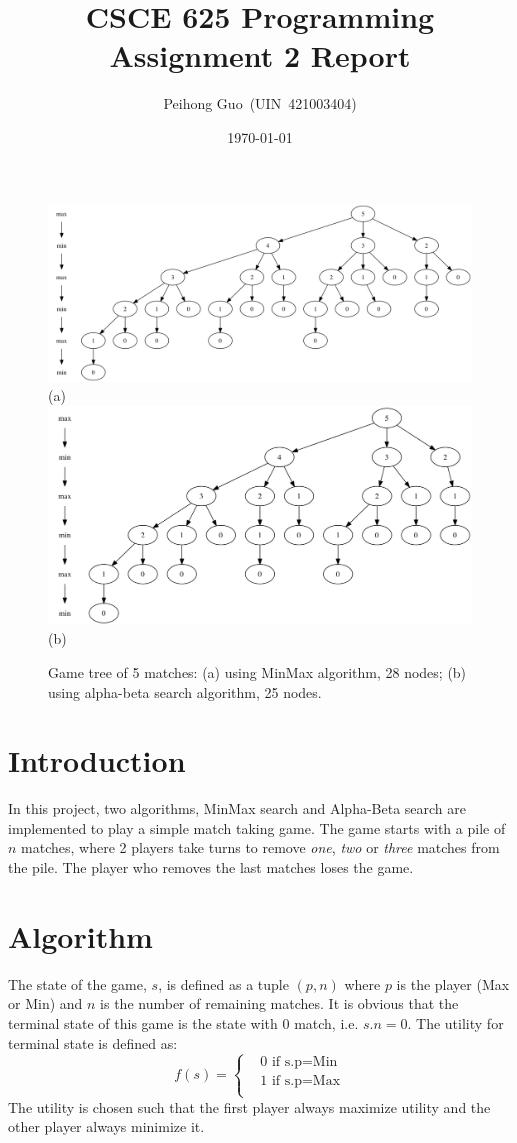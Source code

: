 \documentclass{article}
\title{CSCE 625 Programming Assignment 2 Report}
\author{Peihong Guo~(UIN~421003404)}
\date{\today}
\begin{document}
\maketitle

\begin{figure}[htbp]
\center
\includegraphics[scale=0.2]{images/5_minmax.png}\\
(a)\\
\includegraphics[scale=0.2]{images/5_ab.png}\\
(b)
\caption{Game tree of 5 matches: (a) using MinMax algorithm, 28 nodes; (b) using alpha-beta search algorithm, 25 nodes.}\label{fig:tree5}
\end{figure}

\section{Introduction}
In this project, two algorithms, MinMax search and Alpha-Beta search are implemented to play a simple match taking game.
The game starts with a pile of $n$ matches, where 2 players take turns to remove \textit{one}, \textit{two} or \textit{three} matches from the pile. The player who removes the last matches loses the game.

\section{Algorithm}
The state of the game, $s$, is defined as a tuple $(p, n)$ where $p$ is the player (Max or Min) and $n$ is the number of remaining matches. It is obvious that the terminal state of this game is the state with 0 match, i.e. $s.n = 0$. The utility for terminal state is defined as:
\[
f(s) = \left\{\begin{split}
& 0\text{~if~s.p=Min}\\
& 1\text{~if~s.p=Max}\\
\end{split}\right.
\]
The utility is chosen such that the first player always maximize utility and the other player always minimize it.
\end{document}
